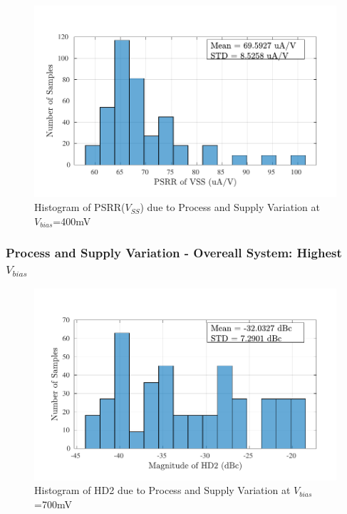 \begin{figure} [H]
\centering
\includegraphics[scale=1]{Figures/Corners/Overall/PV_Mid/PDFs/PV_Mid_psrrn.pdf}
\caption{Histogram of PSRR($V_{SS}$) due to Process and Supply Variation at $V_{bias}$=400mV}
\end{figure}

\subsubsection{Process and Supply Variation - Overeall System: Highest $V_{bias}$}
\begin{figure} [H]
\centering
\includegraphics[scale=1]{Figures/Corners/Overall/PV_Max/PDFs/PV_Max_hd2.pdf}
\caption{Histogram of HD2 due to Process and Supply Variation at $V_{bias}$=700mV}
\end{figure}

